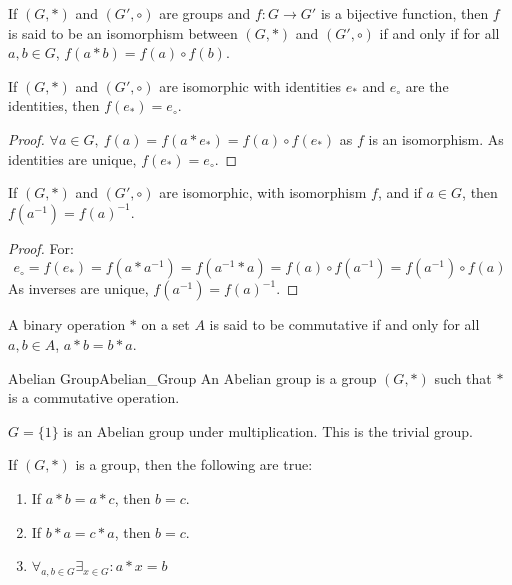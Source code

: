     \begin{definition}
        If $(G,*)$ and $(G',\circ)$ are groups and
        $f:G\rightarrow G'$ is a bijective function, then $f$ is said to
        be an isomorphism between $(G,*)$ and $(G',\circ)$ if and only if
        for all $a,b\in{G}$, $f(a*b)=f(a)\circ{f}(b)$.
    \end{definition}
    \begin{theorem}
        If $(G,*)$ and $(G',\circ)$ are isomorphic with identities $e_{*}$
        and $e_{\circ}$ are the identities, then $f(e_{*})=e_{\circ}$.
    \end{theorem}
    \begin{proof}
        $\forall a\in G,\ f(a)=f(a* e_*) = f(a)\circ f(e_*)$ as $f$ is
        an isomorphism. As identities are unique, $f(e_*)=e_{\circ}$.
    \end{proof}
    \begin{theorem}
        If $(G,*)$ and $(G',\circ)$ are isomorphic, with isomorphism $f$, and if
        $a\in{G}$, then $f(a^{\minus{1}})=f(a)^{\minus{1}}$.
    \end{theorem}
    \begin{proof}
        For:
        \begin{equation}
            e_{\circ}=f(e_*)
                     =f(a*a^{-1})
                     =f(a^{-1}*a)
                     =f(a)\circ f(a^{-1})
                     =f(a^{-1})\circ f(a)
        \end{equation}
        As inverses are unique, $f(a^{-1})=f(a)^{-1}$.
    \end{proof}
    \begin{definition}
    A binary operation $*$ on a set $A$ is said to be commutative if and only for all $a,b\in A$, $a*b = b*a$.
    \end{definition}
    \begin{fdefinition}{Abelian Group}{Abelian_Group}
        An \gls{Abelian group} is a \gls{group} $(G,*)$ such that $*$ is
        a \gls{commutative operation}.
    \end{fdefinition}
    \begin{example}
        $G=\{1\}$ is an Abelian group under multiplication.
        This is the trivial group.
    \end{example}
    \begin{theorem}
        If $(G,*)$ is a group, then the following are true:
        \begin{enumerate}
            \item If $a*b=a*c$, then $b=c$.
            \item If $b*a=c*a$, then $b=c$.
            \item $\forall_{{a,b}\in{G}}\exists_{{x}\in{G}}:a*x=b$
        \end{enumerate}
    \end{theorem}
